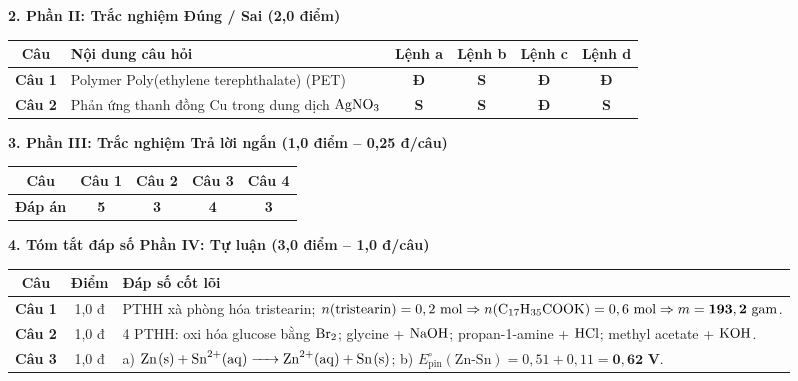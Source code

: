 \documentclass[11pt,a4paper]{article}
\begin{document}
\vspace{2pt}
\noindent
\textbf{\color{mainGreen}2. Phần II: Trắc nghiệm Đúng / Sai (2,0 điểm)}
\begin{center}
\renewcommand{\arraystretch}{1.2}
\begin{tabular}{|c|p{7.5cm}|c|c|c|c|}
\hline
\rowcolor{tableGreen}
\textbf{Câu} & \textbf{Nội dung câu hỏi} & \textbf{Lệnh a} & \textbf{Lệnh b} & \textbf{Lệnh c} & \textbf{Lệnh d} \\
\hline
\textbf{Câu 1} & Polymer Poly(ethylene terephthalate) (PET) & \textbf{\color{hfRed}Đ} & \textbf{\color{gray}S} & \textbf{\color{hfRed}Đ} & \textbf{\color{hfRed}Đ} \\
\hline
\textbf{Câu 2} & Phản ứng thanh đồng Cu trong dung dịch $\ce{AgNO3}$ & \textbf{\color{gray}S} & \textbf{\color{gray}S} & \textbf{\color{hfRed}Đ} & \textbf{\color{gray}S} \\
\hline
\end{tabular}
\end{center}

\vspace{2pt}
\noindent
\textbf{\color{mainGreen}3. Phần III: Trắc nghiệm Trả lời ngắn (1,0 điểm -- 0,25 đ/câu)}
\begin{center}
\renewcommand{\arraystretch}{1.2}
\begin{tabular}{|c|c|c|c|c|}
\hline
\rowcolor{tableGreen}
\textbf{Câu} & \textbf{Câu 1} & \textbf{Câu 2} & \textbf{Câu 3} & \textbf{Câu 4} \\
\hline
\textbf{Đáp án} & \textbf{\color{hfRed}5} & \textbf{\color{hfRed}3} & \textbf{\color{hfRed}4} & \textbf{\color{hfRed}3} \\
\hline
\end{tabular}
\end{center}

\vspace{2pt}
\noindent
\textbf{\color{mainGreen}4. Tóm tắt đáp số Phần IV: Tự luận (3,0 điểm -- 1,0 đ/câu)}
\begin{center}
\renewcommand{\arraystretch}{1.2}
\begin{tabular}{|c|c|p{11.5cm}|}
\hline
\rowcolor{tableGreen}
\textbf{Câu} & \textbf{Điểm} & \textbf{Đáp số cốt lõi} \\
\hline
\textbf{Câu 1} & 1,0 đ & PTHH xà phòng hóa tristearin; $n(\text{tristearin}) = 0,2\text{ mol} \Rightarrow n(\ce{C17H35COOK}) = 0,6\text{ mol} \Rightarrow m = \mathbf{193,2\text{ gam}}$. \\
\hline
\textbf{Câu 2} & 1,0 đ & 4 PTHH: oxi hóa glucose bằng $\ce{Br2}$; glycine + $\ce{NaOH}$; propan-1-amine + $\ce{HCl}$; methyl acetate + $\ce{KOH}$. \\
\hline
\textbf{Câu 3} & 1,0 đ & a) $\ce{Zn(s) + Sn^2+(aq) -> Zn^2+(aq) + Sn(s)}$; b) $E^\circ_\text{pin}(\text{Zn-Sn}) = 0,51 + 0,11 = \mathbf{0,62\text{ V}}$. \\
\hline
\end{tabular}
\end{center}
\end{document}
